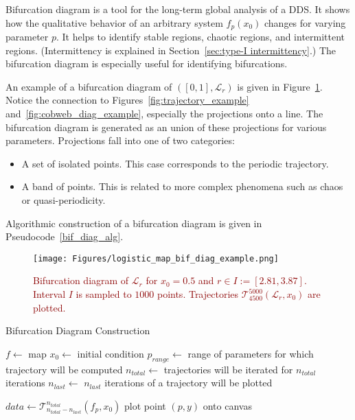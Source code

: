 \begin{remark}
\label{def: bif_diag} 
    Bifurcation diagram is a tool for the long-term global analysis of a DDS.
    It shows how the qualitative behavior of an arbitrary system $f_{p}(x_0)$ changes for varying parameter $p$.
    It helps to identify stable regions, chaotic regions, and intermittent regions. (Intermittency is explained in Section~\ref{sec:type-I intermittency}.)
    The bifurcation diagram is especially useful for identifying bifurcations.
    \par
    An example of a bifurcation diagram of $\left( [0,1], \mathcal{L}_{r} \right)$ is given in Figure~\ref{fig:bif_diag_example}.
    Notice the connection to Figures~\ref{fig:trajectory_example} and~\ref{fig:cobweb_diag_example}, especially the projections onto a line.
    The bifurcation diagram is generated as an union of these projections for various parameters.
    Projections fall into one of two categories:
    \begin{itemize}
        \item{A set of isolated points. This case corresponds to the periodic trajectory.}
        \item{A band of points. This is related to more complex phenomena such as chaos or quasi-periodicity.}
    \end{itemize}
    \par
    Algorithmic construction of a bifurcation diagram is given in Pseudocode~\ref{bif_diag_alg}.
\end{remark}

\begin{figure}[!h]
    \centering
    \texttt{[image: Figures/logistic\_map\_bif\_diag\_example.png]}
    \caption{
        \textcolor{darkred}{
        Bifurcation diagram of $\mathcal{L}_{r}$ for $x_0 = 0.5$ and $r \in I := [ 2.81, 3.87 ]$. 
        Interval $I$ is sampled to $1000$ points. 
        Trajectories $\mathcal{T}_{4500}^{5000}(\mathcal{L}_{r}, x_0)$ are plotted.
        }
    }
    \label{fig:bif_diag_example}
\end{figure}

\begin{algorithm}
\caption{Bifurcation Diagram Construction}\label{bif_diag_alg}
\begin{algorithmic}[1]
\Statex $f \gets$ map
\Statex $x_0 \gets$ initial condition
\Statex $p_{range} \gets$ range of parameters for which trajectory will be computed
\Statex $n_{total} \gets$ trajectories will be iterated for $n_{total}$ iterations
\Statex $n_{last} \gets$ $n_{last}$ iterations of a trajectory will be plotted

    \State $data \leftarrow \mathcal{T}_{n_{total}-n_{last}}^{n_{total}}(f_p, x_0)$
        \State plot point $(p, y)$ onto canvas
    \EndFor
\EndFor

\end{algorithmic}
\end{algorithm}

